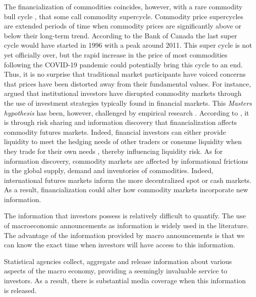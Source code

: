 \documentclass[12pt]{article}
\begin{document}
The financialization of commodities coincides, however, with a rare commodity bull cycle \cite{humphreys2010great}, that some call commodity supercycle. Commodity price supercycles are extended periods of time when commodity prices are significantly above or below their long-term trend. According to the Bank of Canada the last super cycle would have started in 1996 with a peak around 2011. This super cycle is not yet officially over, but the rapid increase in the price of most commodities following the COVID-19 pandemic could potentially bring this cycle to an end. Thus, it is no surprise that traditional market participants have voiced concerns that prices have been distorted  away from their fundamental values. For instance, \citet{masters2009testimony} argued  that institutional investors have disrupted commodity markets through the use of investment strategies typically found in financial markets. This \emph{Masters hypothesis} has been, however, challenged by empirical research \citep{irwin2011index,irwin2012testing,irwin2012financialization}. According to \citet{cheng2014financialization}, it is through risk sharing and information discovery that financialization affects commodity futures markets. Indeed, financial investors can either provide liquidity to meet the hedging needs of other traders or consume liquidity when they trade for their own needs \citep{kang2020tale} , thereby influencing liquidity risk. As for information discovery, commodity markets are affected by informational frictions in the global supply, demand and inventories of commodities. Indeed, international futures markets inform the more decentralized spot or cash markets. As a result, financialization could alter how commodity markets incorporate new information.

The information that investors possess is relatively difficult to quantify. The use of macroeconomic announcements as information is widely used in the literature. The advantage of the information provided by macro announcements is that we can know the exact time when investors will have access to this information.

Statistical agencies collect, aggregate and release information about various aspects of the macro economy, providing a seemingly invaluable service to investors. As a result, there is substantial media coverage when this information is released.
\end{document}
